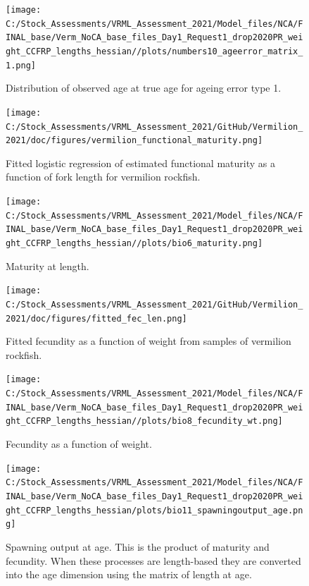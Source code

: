 \documentclass[11pt,
  english,
]{article}
\begin{document}
\begin{figure}
\centering
\texttt{[image: C:/Stock\_Assessments/VRML\_Assessment\_2021/Model\_files/NCA/FINAL\_base/Verm\_NoCA\_base\_files\_Day1\_Request1\_drop2020PR\_weight\_CCFRP\_lengths\_hessian//plots/numbers10\_ageerror\_matrix\_1.png]}
\caption{Distribution of observed age at true age for ageing error type 1.\label{fig:ageerror}}
\end{figure}

\begin{figure}
\centering
\texttt{[image: C:/Stock\_Assessments/VRML\_Assessment\_2021/GitHub/Vermilion\_2021/doc/figures/vermilion\_functional\_maturity.png]}
\caption{Fitted logistic regression of estimated functional maturity as a function of fork length for vermilion rockfish.\label{fig:functional-maturity}}
\end{figure}

\begin{figure}
\centering
\texttt{[image: C:/Stock\_Assessments/VRML\_Assessment\_2021/Model\_files/NCA/FINAL\_base/Verm\_NoCA\_base\_files\_Day1\_Request1\_drop2020PR\_weight\_CCFRP\_lengths\_hessian//plots/bio6\_maturity.png]}
\caption{Maturity at length.\label{fig:maturity}}
\end{figure}

\begin{figure}
\centering
\texttt{[image: C:/Stock\_Assessments/VRML\_Assessment\_2021/GitHub/Vermilion\_2021/doc/figures/fitted\_fec\_len.png]}
\caption{Fitted fecundity as a function of weight from samples of vermilion rockfish.\label{fig:fitted-fecundity}}
\end{figure}

\begin{figure}
\centering
\texttt{[image: C:/Stock\_Assessments/VRML\_Assessment\_2021/Model\_files/NCA/FINAL\_base/Verm\_NoCA\_base\_files\_Day1\_Request1\_drop2020PR\_weight\_CCFRP\_lengths\_hessian//plots/bio8\_fecundity\_wt.png]}
\caption{Fecundity as a function of weight.\label{fig:fecundity}}
\end{figure}

\begin{figure}
\centering
\texttt{[image: C:/Stock\_Assessments/VRML\_Assessment\_2021/Model\_files/NCA/FINAL\_base/Verm\_NoCA\_base\_files\_Day1\_Request1\_drop2020PR\_weight\_CCFRP\_lengths\_hessian/plots/bio11\_spawningoutput\_age.png]}
\caption{Spawning output at age. This is the product of maturity and fecundity. When these processes are length-based they are converted into the age dimension using the matrix of length at age.\label{fig:spawnage}}
\end{figure}
\end{document}

